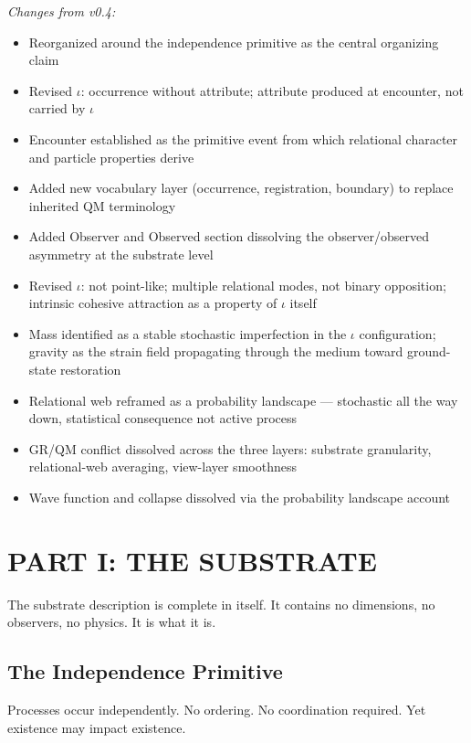 \documentclass[11pt,letterpaper]{article}
\begin{document}
\emph{Changes from v0.4:}
\begin{itemize}
\item Reorganized around the independence primitive as the central organizing claim
\item Revised \(\iota\): occurrence without attribute; attribute produced at encounter, not carried by \(\iota\)
\item Encounter established as the primitive event from which relational character and particle properties derive
\item Added new vocabulary layer (occurrence, registration, boundary) to replace inherited QM terminology
\item Added Observer and Observed section dissolving the observer/observed asymmetry at the substrate level
\item Revised \(\iota\): not point-like; multiple relational modes, not binary opposition; intrinsic cohesive attraction as a property of \(\iota\) itself
\item Mass identified as a stable stochastic imperfection in the \(\iota\) configuration; gravity as the strain field propagating through the medium toward ground-state restoration
\item Relational web reframed as a probability landscape --- stochastic all the way down, statistical consequence not active process
\item GR/QM conflict dissolved across the three layers: substrate granularity, relational-web averaging, view-layer smoothness
\item Wave function and collapse dissolved via the probability landscape account
\end{itemize}


\section{PART I: THE SUBSTRATE}
\label{sec:org9b99f6b}

The substrate description is complete in itself. It contains no dimensions, no observers, no physics. It is what it is.

\subsection{The Independence Primitive}
\label{sec:orgd721fc4}


Processes occur independently. No ordering. No coordination required. Yet existence may impact existence.
\end{document}

